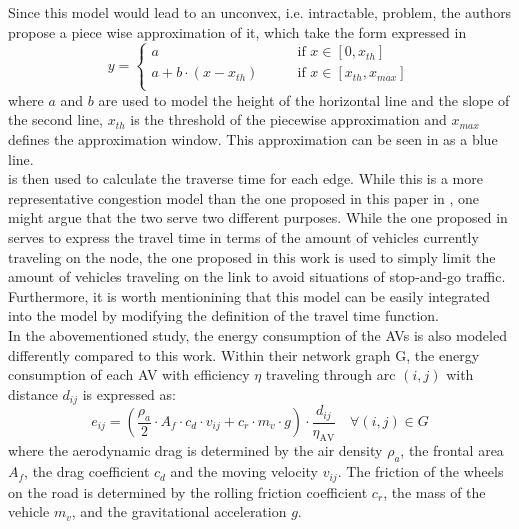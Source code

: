 Since this model would lead to an unconvex, i.e. intractable, problem, the authors propose a piece wise approximation of it, which take the form expressed in 
\begin{equation}
	y = \begin{cases}
		a \quad\quad &\text{if } x\in[0,x_{th}]\\ 
		a + b\cdot(x - x_{th}) \quad\quad &\text{if }x\in[x_{th}, x_{max}]\\ 
	\end{cases}
	\label{eq:model_bpr_approximation}
\end{equation}
where $a$ and $b$ are used to model the height of the horizontal line and the slope of the second line, $x_{th}$ is the threshold of the piecewise approximation and $x_{max}$ defines the approximation window. This approximation can be seen in  as a blue line. \\
 is then used to calculate the traverse time for each edge. While this is a more representative congestion model than the one proposed in this paper in , one might argue that the two serve two different purposes. While the one proposed in \cite{Salaza2019Cong} serves to express the travel time in terms of the amount of vehicles currently traveling on the node, the one proposed in this work is used to simply limit the amount of vehicles
traveling on the link to avoid situations of stop-and-go traffic. Furthermore, it is worth mentionining that this model can be easily integrated into the model by modifying the definition of the travel time function. \\
In the abovementioned study, the energy consumption of the AVs is also modeled differently compared to this work. Within their network graph G, the energy consumption of each AV with efficiency $\eta$ traveling through arc $(i,j)$ with distance $d_{ij}$ is expressed as:
\begin{equation}
e_{ij} = (\dfrac{\rho_a}{2}\cdot A_f \cdot c_d \cdot v_{ij} + c_r \cdot m_v \cdot g)\cdot \dfrac{d_{ij}}{\eta_{\text{AV}}} \quad \forall (i,j) \in G
\end{equation}
where the aerodynamic drag is determined by the air density $\rho_a$, the frontal area $A_f$,  the drag coefficient $c_d$ and the moving velocity $v_{ij}$. The friction of the wheels on the road is determined by the rolling friction coefficient $c_r$, the mass of the vehicle $m_v$, and the gravitational acceleration $g$. \\ 
